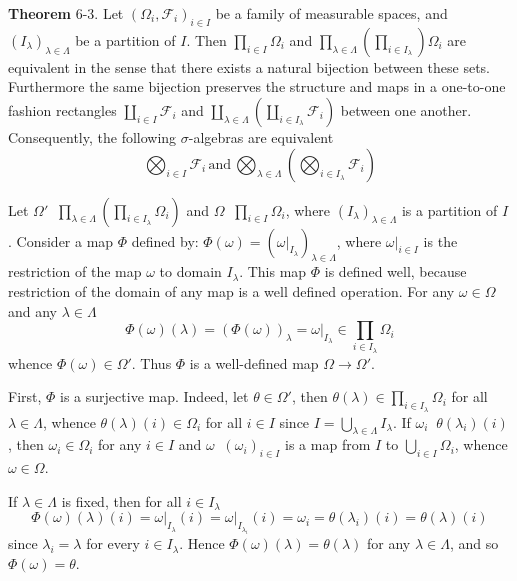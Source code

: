 \documentclass[a4paper]{article}
\newcommand{\brac}[1]{\left ( #1 \right )}
\newcommand{\induc}[1]{\left . #1 \right \vert}
\newcommand{\Fcal}{\mathcal{F}}
\newcommand{\defn}{\mathop{\overset{\Delta}{=}}\nolimits}
\begin{document}
\label{thm:product_partition} \noindent \textbf{Theorem} 6-3.
Let $\brac{\Omega_i, \Fcal_i}_{i\in I}$ be a family of measurable spaces, and $\brac{I_\lambda}_{\lambda\in \Lambda}$ be a partition of $I$. Then $\prod_{i\in I} \Omega_i$ and $\prod_{\lambda\in \Lambda}\brac{ \prod_{i\in I_\lambda} } \Omega_i$ are equivalent in the sense that there exists a natural bijection between these sets. Furthermore the same bijection preserves the structure and maps in a one-to-one fashion rectangles $\coprod_{i\in I} \Fcal_i$ and $\coprod_{\lambda\in \Lambda} \brac{ \coprod_{i\in I_\lambda} \Fcal_i }$ between one another. Consequently, the following $\sigma$-algebras are equivalent\[ \bigotimes_{i\in I} \Fcal_i\,\text{and}\, \bigotimes_{\lambda\in \Lambda} \brac{ \bigotimes_{i\in I_\lambda} \Fcal_i }\]

Let $\Omega' \defn \prod_{\lambda \in \Lambda} \brac{ \prod_{i \in I_\lambda}\Omega_i }$ and $\Omega \defn \prod_{i \in I}\Omega_i$, where $\brac{I_\lambda}_{\lambda \in \Lambda}$ is a partition of $I$. Consider a map $\Phi$ defined by: $\Phi\brac{\omega} = \brac{\induc{\omega}_{I_\lambda}}_{\lambda \in \Lambda}$, where $\induc{\omega}_{i \in I}$ is the restriction of the map $\omega$ to domain $I_\lambda$. This map $\Phi$ is defined well, because restriction of the domain of any map is a well defined operation. For any $\omega \in \Omega$ and any $\lambda\in \Lambda$ \[\Phi\brac{\omega}\brac{\lambda} = \brac{\Phi\brac{\omega}}_\lambda = \induc{ \omega }_{I_\lambda} \in \prod_{i\in I_\lambda} \Omega_i\] whence $\Phi\brac{\omega}\in \Omega'$. Thus $\Phi$ is a well-defined map $\Omega \to \Omega'$.

First, $\Phi$ is a surjective map. Indeed, let $\theta \in \Omega'$, then $\theta\brac{\lambda} \in \prod_{i \in I_\lambda} \Omega_i$ for all $\lambda \in \Lambda$, whence $\theta\brac{\lambda}\brac{i} \in \Omega_i$ for all $i \in I$ since $I=\bigcup_{\lambda\in \Lambda} I_\lambda$. If $\omega_i \defn \theta\brac{\lambda_i}\brac{i}$, then $\omega_i \in \Omega_i$ for any $i \in I$ and $\omega\defn \brac{\omega_i}_{i\in I}$ is a map from $I$ to $\bigcup_{i \in I}\Omega_i$, whence $\omega \in \Omega$.

If $\lambda\in \Lambda$ is fixed, then for all $i\in I_\lambda$ \[\Phi\brac{\omega}\brac{\lambda}\brac{i} = \induc{\omega}_{I_\lambda}\brac{i} = \induc{\omega}_{I_{\lambda_i}}\brac{i} = \omega_i = \theta\brac{\lambda_i}\brac{i} = \theta\brac{\lambda}\brac{i}\] since $\lambda_i = \lambda$ for every $i \in I_\lambda$. Hence $\Phi\brac{\omega}\brac{\lambda} = \theta\brac{\lambda}$ for any $\lambda \in \Lambda$, and so $\Phi\brac{\omega} = \theta$.
\end{document}
